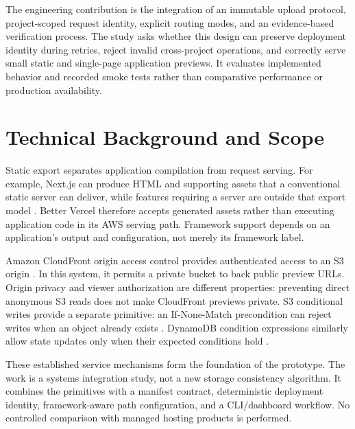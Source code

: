 \documentclass[conference,letterpaper]{IEEEtran}
\begin{document}
The engineering contribution is the integration of an immutable upload protocol, project-scoped request identity, explicit routing modes, and an evidence-based verification process. The study asks whether this design can preserve deployment identity during retries, reject invalid cross-project operations, and correctly serve small static and single-page application previews. It evaluates implemented behavior and recorded smoke tests rather than comparative performance or production availability.

\section{Technical Background and Scope}
Static export separates application compilation from request serving. For example, Next.js can produce HTML and supporting assets that a conventional static server can deliver, while features requiring a server are outside that export model \cite{r2}. Better Vercel therefore accepts generated assets rather than executing application code in its AWS serving path. Framework support depends on an application's output and configuration, not merely its framework label.

Amazon CloudFront origin access control provides authenticated access to an S3 origin \cite{r3}. In this system, it permits a private bucket to back public preview URLs. Origin privacy and viewer authorization are different properties: preventing direct anonymous S3 reads does not make CloudFront previews private. S3 conditional writes provide a separate primitive: an If-None-Match precondition can reject writes when an object already exists \cite{r4}. DynamoDB condition expressions similarly allow state updates only when their expected conditions hold \cite{r5}.

These established service mechanisms form the foundation of the prototype. The work is a systems integration study, not a new storage consistency algorithm. It combines the primitives with a manifest contract, deterministic deployment identity, framework-aware path configuration, and a CLI/dashboard workflow. No controlled comparison with managed hosting products is performed.
\end{document}
